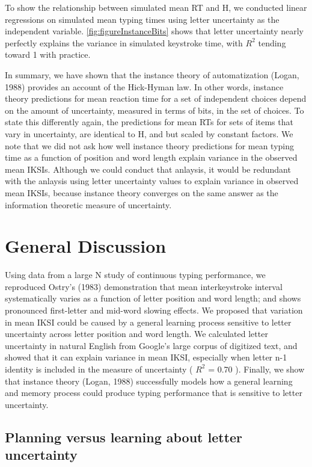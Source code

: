 \documentclass[,man,floatsintext]{apa6}
\begin{document}
To show the relationship between simulated mean RT and H, we conducted linear regressions on simulated mean typing times using letter uncertainty as the independent variable. \ref{fig:figureInstanceBits} shows that letter uncertainty nearly perfectly explains the variance in simulated keystroke time, with \(R^2\) tending toward 1 with practice.

In summary, we have shown that the instance theory of automatization (Logan, 1988) provides an account of the Hick-Hyman law. In other words, instance theory predictions for mean reaction time for a set of independent choices depend on the amount of uncertainty, measured in terms of bits, in the set of choices. To state this differently again, the predictions for mean RTs for sets of items that vary in uncertainty, are identical to H, and but scaled by constant factors. We note that we did not ask how well instance theory predictions for mean typing time as a function of position and word length explain variance in the observed mean IKSIs. Although we could conduct that anlaysis, it would be redundant with the anlaysis using letter uncertainty values to explain variance in observed mean IKSIs, because instance theory converges on the same answer as the information theoretic measure of uncertainty.

\hypertarget{general-discussion}{%
\section{General Discussion}\label{general-discussion}}

Using data from a large N study of continuous typing performance, we reproduced Ostry's (1983) demonstration that mean interkeystroke interval systematically varies as a function of letter position and word length; and shows pronounced first-letter and mid-word slowing effects. We proposed that variation in mean IKSI could be caused by a general learning process sensitive to letter uncertainty across letter position and word length. We calculated letter uncertainty in natural English from Google's large corpus of digitized text, and showed that it can explain variance in mean IKSI, especially when letter n-1 identity is included in the measure of uncertainty ( \(R^2\) = 0.70 ). Finally, we show that instance theory (Logan, 1988) successfully models how a general learning and memory process could produce typing performance that is sensitive to letter uncertainty.

\hypertarget{planning-versus-learning-about-letter-uncertainty}{%
\subsection{Planning versus learning about letter uncertainty}\label{planning-versus-learning-about-letter-uncertainty}}
\end{document}
